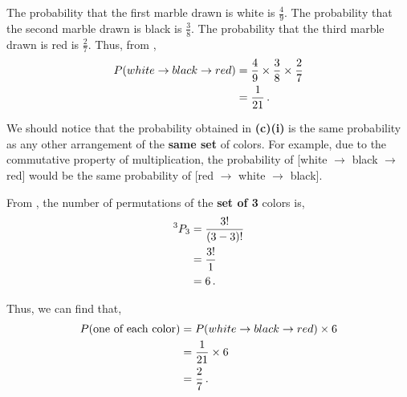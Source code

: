\begin{subquestions}

\subquestion
 
\begin{subsubquestions}
	
\subsubquestion

The probability that the first marble drawn is white is $\frac{4}{9}$. The probability that the second marble drawn is black is $\frac{3}{8}$. The probability that the third marble drawn is red is $\frac{2}{7}$. Thus, from , 
\begin{align}
	P(white \rightarrow black \rightarrow red) & = \frac{4}{9} \times \frac{3}{8} \times \frac{2}{7} \nonumber \\
	                                           & = \frac{1}{21} \,.
\end{align}
	

\subsubquestion

We should notice that the probability obtained in \textbf{(c)(i)} is the same probability as any other arrangement of the \textbf{same set} of colors. For example, due to the commutative property of multiplication, the probability of [white $\rightarrow$ black $\rightarrow$ red] would be the same probability of [red $\rightarrow$ white $\rightarrow$ black]. 

From , the number of permutations of the \textbf{set of 3} colors is,
\begin{align}
	^3P_3 & = \frac{3!}{(3-3)!} \nonumber \\
	      & = \frac{3!}{1} \nonumber \\
	      & = 6 \,.
\end{align}

Thus, we can find that,
\begin{align}
	P(\text{one of each color}) & = P(white \rightarrow black \rightarrow red) \times 6 \nonumber \\
	                     & = \frac{1}{21} \times 6 \nonumber \\
	                     & = \frac{2}{7} \,.
\end{align}


\subsubquestion


\end{subsubquestions}
\end{subquestions}
